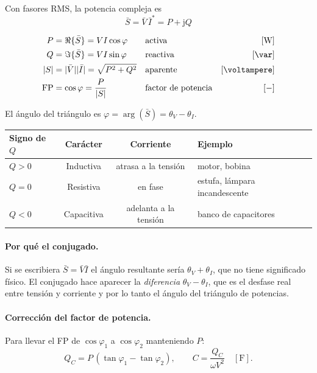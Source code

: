 \documentclass[11pt,a4paper]{article}
\newcommand{\ju}{\mathrm{j}}
\begin{document}
Con fasores RMS, la potencia compleja es
\begin{equation}
  \boxed{\ \bar{S} = \bar{V}\,\bar{I}^{*} = P + \ju Q \ }
\end{equation}

\begin{align}
  P     &= \Re\{\bar{S}\} = V I \cos\varphi &&\text{activa}      & [\unit{\watt}] \\
  Q     &= \Im\{\bar{S}\} = V I \sin\varphi &&\text{reactiva}    & [\unit{\var}] \\
  |S|   &= |\bar{V}||\bar{I}| = \sqrt{P^2+Q^2} &&\text{aparente} & [\unit{\voltampere}] \\
  \mathrm{FP} &= \cos\varphi = \frac{P}{|S|} &&\text{factor de potencia} & [-]
\end{align}

\noindent El ángulo del triángulo es $\varphi = \arg(\bar{S}) = \theta_V - \theta_I$.

\begin{table}[h]
\centering
\begin{tabular}{@{}lccl@{}}
\toprule
\textbf{Signo de $Q$} & \textbf{Carácter} & \textbf{Corriente} & \textbf{Ejemplo} \\
\midrule
$Q > 0$ & Inductiva  & atrasa a la tensión   & motor, bobina \\
$Q = 0$ & Resistiva  & en fase               & estufa, lámpara incandescente \\
$Q < 0$ & Capacitiva & adelanta a la tensión & banco de capacitores \\
\bottomrule
\end{tabular}
\end{table}

\paragraph{Por qué el conjugado.} Si se escribiera $\bar{S} = \bar{V}\bar{I}$ el ángulo
resultante sería $\theta_V + \theta_I$, que no tiene significado físico. El conjugado hace
aparecer la \emph{diferencia} $\theta_V - \theta_I$, que es el desfase real entre tensión y
corriente y por lo tanto el ángulo del triángulo de potencias.

\paragraph{Corrección del factor de potencia.} Para llevar el FP de $\cos\varphi_1$ a
$\cos\varphi_2$ manteniendo $P$:
\begin{equation}
  Q_C = P\,(\tan\varphi_1 - \tan\varphi_2),
  \qquad
  C = \frac{Q_C}{\omega V^2} \quad [\unit{\farad}].
\end{equation}
\end{document}
